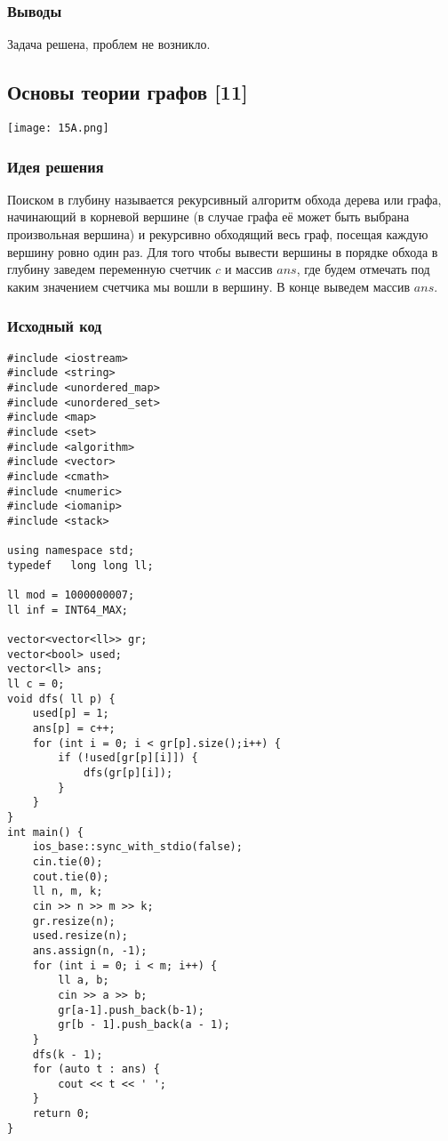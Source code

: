 \documentclass[12pt]{article}
\begin{document}
\subsubsection*{Выводы}
Задача решена, проблем не возникло. 
\subsection*{Основы теории графов [11]}
\begin{center}
\texttt{[image: 15A.png]}
\end{center}
\subsubsection*{Идея решения}
Поиском в глубину называется рекурсивный алгоритм обхода дерева или графа, начинающий в корневой вершине (в случае графа её может быть выбрана произвольная вершина) и рекурсивно обходящий весь граф, посещая каждую вершину ровно один раз. Для того чтобы вывести вершины в порядке обхода в глубину заведем переменную счетчик $c$ и массив $ans$, где будем отмечать под каким значением счетчика мы вошли в вершину. В конце выведем массив $ans$.
\subsubsection*{Исходный код}
\begin{lstlisting}
#include <iostream>
#include <string>
#include <unordered_map>
#include <unordered_set>
#include <map>
#include <set>
#include <algorithm>
#include <vector>
#include <cmath>
#include <numeric>
#include <iomanip>
#include <stack>

using namespace std;
typedef   long long ll;

ll mod = 1000000007;
ll inf = INT64_MAX;

vector<vector<ll>> gr;
vector<bool> used;
vector<ll> ans;
ll c = 0;
void dfs( ll p) {
    used[p] = 1;
    ans[p] = c++;
    for (int i = 0; i < gr[p].size();i++) {
        if (!used[gr[p][i]]) {
            dfs(gr[p][i]);
        }
    }
}
int main() {
    ios_base::sync_with_stdio(false);
    cin.tie(0);
    cout.tie(0);
    ll n, m, k;
    cin >> n >> m >> k;
    gr.resize(n);
    used.resize(n);
    ans.assign(n, -1);
    for (int i = 0; i < m; i++) {
        ll a, b;
        cin >> a >> b;
        gr[a-1].push_back(b-1);
        gr[b - 1].push_back(a - 1);
    }
    dfs(k - 1);
    for (auto t : ans) {
        cout << t << ' ';
    }
    return 0;
}
\end{lstlisting}
\end{document}
